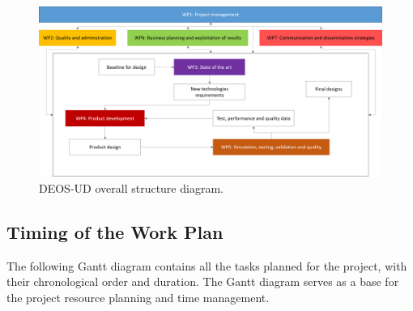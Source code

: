 \begin{figure}[H]
\centering
\includegraphics[width=\textwidth]{images/overallstructure.png}
\caption{DEOS-UD overall structure diagram.} 
\label{overallstructure}
\end{figure}

\subsection{Timing of the Work Plan}

The following Gantt diagram contains all the tasks planned for the project, with their chronological order and duration. The Gantt diagram serves as a base for the project resource planning and time management.

